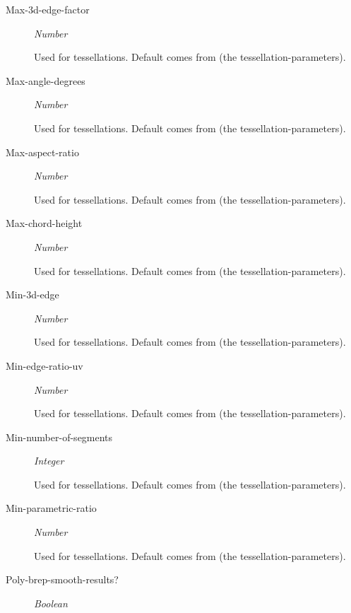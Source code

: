 \documentclass [11pt]{book}
\begin{document}
\begin{itemize}
\begin{description}
\item [Max-3d-edge-factor]
\emph{Number}

 Used for tessellations. Default comes from (the tessellation-parameters).




\item [Max-angle-degrees]
\emph{Number}

 Used for tessellations. Default comes from (the tessellation-parameters).




\item [Max-aspect-ratio]
\emph{Number}

 Used for tessellations. Default comes from (the tessellation-parameters).




\item [Max-chord-height]
\emph{Number}

 Used for tessellations. Default comes from (the tessellation-parameters).




\item [Min-3d-edge]
\emph{Number}

 Used for tessellations. Default comes from (the tessellation-parameters).




\item [Min-edge-ratio-uv]
\emph{Number}

 Used for tessellations. Default comes from (the tessellation-parameters).




\item [Min-number-of-segments]
\emph{Integer}

 Used for tessellations. Default comes from (the tessellation-parameters).




\item [Min-parametric-ratio]
\emph{Number}

 Used for tessellations. Default comes from (the tessellation-parameters).




\item [Poly-brep-smooth-results?]
\emph{Boolean}


\end{description}
\end{itemize}
\end{document}

